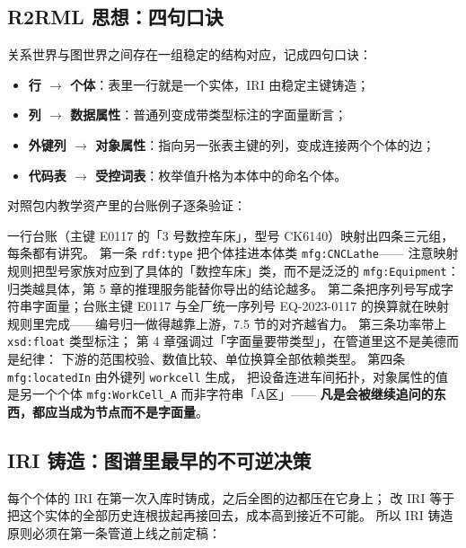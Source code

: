 \subsection{R2RML 思想：四句口诀}

关系世界与图世界之间存在一组稳定的结构对应，记成四句口诀：

\begin{itemize}
\item \textbf{行 \(\rightarrow\) 个体}：表里一行就是一个实体，IRI 由稳定主键铸造；
\item \textbf{列 \(\rightarrow\) 数据属性}：普通列变成带类型标注的字面量断言；
\item \textbf{外键列 \(\rightarrow\) 对象属性}：指向另一张表主键的列，变成连接两个个体的边；
\item \textbf{代码表 \(\rightarrow\) 受控词表}：枚举值升格为本体中的命名个体。
\end{itemize}

对照包内教学资产里的台账例子逐条验证：



一行台账（主键 E0117 的「3 号数控车床」，型号 CK6140）映射出四条三元组，每条都有讲究。
第一条 \texttt{rdf:type} 把个体挂进本体类 \texttt{mfg:CNCLathe}——
注意映射规则把型号家族对应到了具体的「数控车床」类，而不是泛泛的 \texttt{mfg:Equipment}：
归类越具体，第 5 章的推理服务能替你导出的结论越多。
第二条把序列号写成字符串字面量；台账主键 E0117 与全厂统一序列号 EQ-2023-0117
的换算就在映射规则里完成——编号归一做得越靠上游，7.5 节的对齐越省力。
第三条功率带上 \texttt{xsd:float} 类型标注；
第 4 章强调过「字面量要带类型」，在管道里这不是美德而是纪律：
下游的范围校验、数值比较、单位换算全部依赖类型。
第四条 \texttt{mfg:locatedIn} 由外键列 \texttt{workcell} 生成，
把设备连进车间拓扑，对象属性的值是另一个个体 \texttt{mfg:WorkCell\_A} 而非字符串「A区」——
\textbf{凡是会被继续追问的东西，都应当成为节点而不是字面量}。

\subsection{IRI 铸造：图谱里最早的不可逆决策}

每个个体的 IRI 在第一次入库时铸成，之后全图的边都压在它身上；
改 IRI 等于把这个实体的全部历史连根拔起再接回去，成本高到接近不可能。
所以 IRI 铸造原则必须在第一条管道上线之前定稿：

